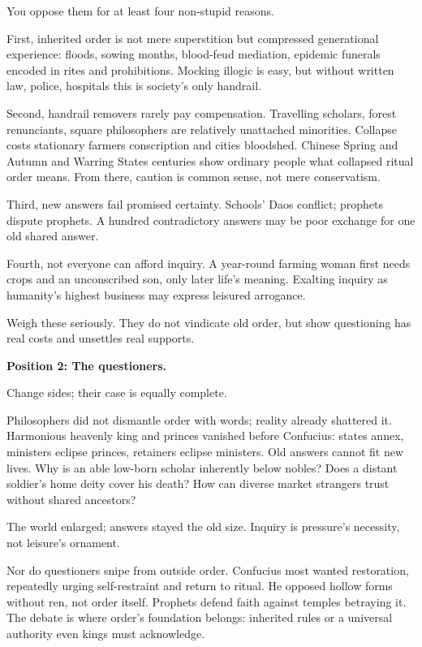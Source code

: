 You oppose them for at least four non-stupid reasons.

First, inherited order is not mere superstition but compressed generational experience: floods, sowing months, blood-feud mediation, epidemic funerals encoded in rites and prohibitions. Mocking illogic is easy, but without written law, police, hospitals this is society's only handrail.

Second, handrail removers rarely pay compensation. Travelling scholars, forest renunciants, square philosophers are relatively unattached minorities. Collapse costs stationary farmers conscription and cities bloodshed. Chinese Spring and Autumn and Warring States centuries show ordinary people what collapsed ritual order means. From there, caution is common sense, not mere conservatism.

Third, new answers fail promised certainty. Schools' Daos conflict; prophets dispute prophets. A hundred contradictory answers may be poor exchange for one old shared answer.

Fourth, not everyone can afford inquiry. A year-round farming woman first needs crops and an unconscribed son, only later life's meaning. Exalting inquiry as humanity's highest business may express leisured arrogance.

Weigh these seriously. They do not vindicate old order, but show questioning has real costs and unsettles real supports.

\textbf{Position 2: The questioners.}

Change sides; their case is equally complete.

Philosophers did not dismantle order with words; reality already shattered it. Harmonious heavenly king and princes vanished before Confucius: states annex, ministers eclipse princes, retainers eclipse ministers. Old answers cannot fit new lives. Why is an able low-born scholar inherently below nobles? Does a distant soldier's home deity cover his death? How can diverse market strangers trust without shared ancestors?

The world enlarged; answers stayed the old size. Inquiry is pressure's necessity, not leisure's ornament.

Nor do questioners snipe from outside order. Confucius most wanted restoration, repeatedly urging self-restraint and return to ritual. He opposed hollow forms without ren, not order itself. Prophets defend faith against temples betraying it. The debate is where order's foundation belongs: inherited rules or a universal authority even kings must acknowledge.

